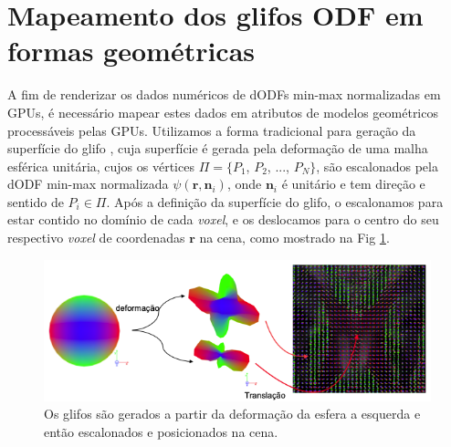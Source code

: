 \section{Mapeamento dos glifos ODF em formas geométricas}
\label{sec::renderizacao_de_glifos_ODF}


A fim de renderizar os dados numéricos de dODFs min-max normalizadas em GPUs, é necessário mapear estes dados em atributos de modelos geométricos processáveis pelas GPUs. Utilizamos a forma tradicional para geração da superfície do glifo \cite{peeters2009}, cuja superfície é gerada pela deformação de uma malha esférica unitária, cujos os vértices $\Pi = \{
P_1$,
$P_2$, ...,
$P_N
\}$, são escalonados pela dODF min-max normalizada $\psi(\mathbf{r}, \mathbf{n}_i)$, onde $\mathbf{n}_i$ é unitário e tem direção e sentido de $P_i \in \Pi$. Após a definição da superfície do glifo, o escalonamos para estar contido no domínio de cada \textit{voxel}, e os deslocamos para o centro do seu respectivo \textit{voxel} de coordenadas $\mathbf{r}$ na cena, como mostrado na Fig \ref{fig::esfera_deformada_cena}.

\begin{figure}[htb]
    \centering
    \includegraphics[width=1.0\linewidth, angle=0]{figs/Esquema_Glifo/Renderizacao_multimodal.png}
    \caption{
    Os glifos são gerados a partir da deformação da esfera a esquerda e então escalonados e posicionados na cena.
    }
    \label{fig::esfera_deformada_cena}
\end{figure}


